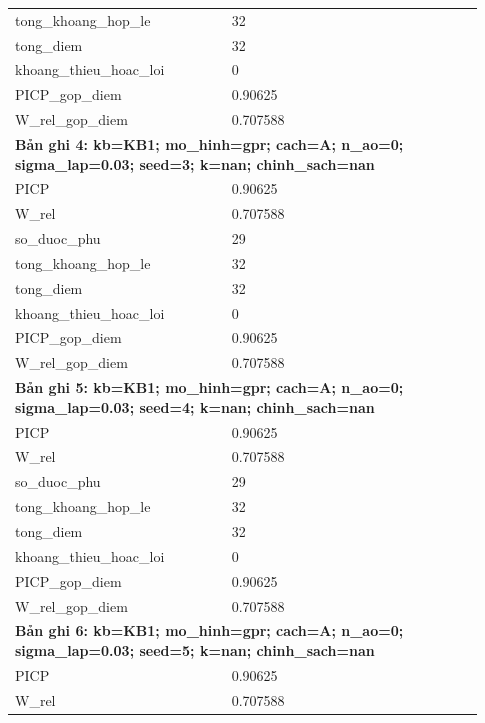 \begin{longtable}{p{0.43\linewidth}p{0.50\linewidth}}
tong\_\allowbreak khoang\_\allowbreak hop\_\allowbreak le & 32 \\
tong\_\allowbreak diem & 32 \\
khoang\_\allowbreak thieu\_\allowbreak hoac\_\allowbreak loi & 0 \\
PICP\_\allowbreak gop\_\allowbreak diem & 0.90625 \\
W\_\allowbreak rel\_\allowbreak gop\_\allowbreak diem & 0.707588 \\
\midrule
\multicolumn{2}{p{0.95\linewidth}}{\textbf{Bản ghi 4: kb=KB1; mo\_hinh=gpr; cach=A; n\_ao=0; sigma\_lap=0.03; seed=3; k=nan; chinh\_sach=nan}} \\
PICP & 0.90625 \\
W\_\allowbreak rel & 0.707588 \\
so\_\allowbreak duoc\_\allowbreak phu & 29 \\
tong\_\allowbreak khoang\_\allowbreak hop\_\allowbreak le & 32 \\
tong\_\allowbreak diem & 32 \\
khoang\_\allowbreak thieu\_\allowbreak hoac\_\allowbreak loi & 0 \\
PICP\_\allowbreak gop\_\allowbreak diem & 0.90625 \\
W\_\allowbreak rel\_\allowbreak gop\_\allowbreak diem & 0.707588 \\
\midrule
\multicolumn{2}{p{0.95\linewidth}}{\textbf{Bản ghi 5: kb=KB1; mo\_hinh=gpr; cach=A; n\_ao=0; sigma\_lap=0.03; seed=4; k=nan; chinh\_sach=nan}} \\
PICP & 0.90625 \\
W\_\allowbreak rel & 0.707588 \\
so\_\allowbreak duoc\_\allowbreak phu & 29 \\
tong\_\allowbreak khoang\_\allowbreak hop\_\allowbreak le & 32 \\
tong\_\allowbreak diem & 32 \\
khoang\_\allowbreak thieu\_\allowbreak hoac\_\allowbreak loi & 0 \\
PICP\_\allowbreak gop\_\allowbreak diem & 0.90625 \\
W\_\allowbreak rel\_\allowbreak gop\_\allowbreak diem & 0.707588 \\
\midrule
\multicolumn{2}{p{0.95\linewidth}}{\textbf{Bản ghi 6: kb=KB1; mo\_hinh=gpr; cach=A; n\_ao=0; sigma\_lap=0.03; seed=5; k=nan; chinh\_sach=nan}} \\
PICP & 0.90625 \\
W\_\allowbreak rel & 0.707588 \\

\end{longtable}
